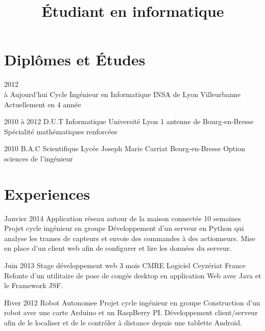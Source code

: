 \documentclass[10pt,a4paper]{moderncv}
\title{Étudiant en informatique}
\begin{document}
\maketitle
\pagestyle{empty}


\section{Diplômes et Études}

\cventry
	{2012\\à Aujourd'hui}
	{Cycle Ingénieur en Informatique}
	{INSA de Lyon}
	{Villeurbanne}
	{}
	{Actuellement en 4 année}

\cventry
	{2010 à 2012}
	{D.U.T Informatique}
	{Université Lyon 1}
	{antenne de Bourg-en-Bresse}
	{}
	{Spécialité mathématiques renforcées}

\cventry
	{2010}
	{B.A.C Scientifique}
	{Lycée Joseph Marie Carriat}
	{Bourg-en-Bresse}
	{}
	{Option sciences de l'ingénieur}


\section{Experiences}

\cventry
	{Janvier 2014}
	{Application réseau autour de la maison connectée}
	{10 semaines}
	{}
	{Projet cycle ingénieur en groupe}
	{Développement d'un serveur en Python qui analyse les trames de capteurs et envoie des commandes à des actionneurs. Mise en place d'un client web afin de configurer et lire les données du serveur.}

\cventry
	{Juin 2013}
	{Stage développement web}
	{3 mois}
	{CMRE Logiciel}
	{Ceyzériat France}
	{Refonte d'un utilitaire de pose de congés desktop en application Web avec Java et le Framework JSF.}

\cventry
	{Hiver 2012}
	{Robot Autonomee}
	{}
	{}
	{Projet cycle ingénieur en groupe}
	{Construction d'un robot avec une carte Arduino et un RaspBerry PI. Développement client/serveur afin de le localiser et de le contrôler à distance depuis une tablette Android.}
\end{document}
